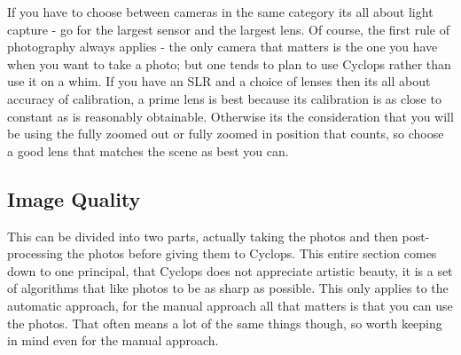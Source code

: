 \documentclass[10pt,a4paper,twoside]{article}
\begin{document}
If you have to choose between cameras in the same category its all about light capture - go for the largest sensor and the largest lens. Of course, the first rule of photography always applies - the only camera that matters is the one you have when you want to take a photo; but one tends to plan to use Cyclops rather than use it on a whim.
If you have an SLR and a choice of lenses then its all about accuracy of calibration, a prime lens is best because its calibration is as close to constant as is reasonably obtainable.
Otherwise its the consideration that you will be using the fully zoomed out or fully zoomed in position that counts, so choose a good lens that matches the scene as best you can.


\subsection{Image Quality}
This can be divided into two parts, actually taking the photos and then post-processing the photos before giving them to Cyclops.
This entire section comes down to one principal, that Cyclops does not appreciate artistic beauty, it is a set of algorithms that like photos to be as sharp as possible. This only applies to the automatic approach, for the manual approach all that matters is that you can use the photos. That often means a lot of the same things though, so worth keeping in mind even for the manual approach.
\end{document}
